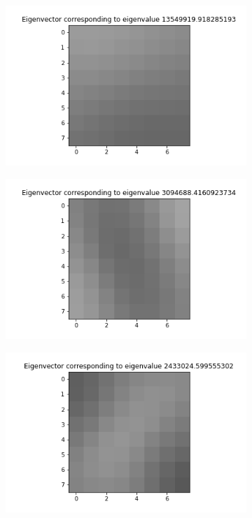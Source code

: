 \documentclass{article}
\begin{document}
\begin{figure}[h]
\begin{subfigure}{0.2\linewidth}
    \end{subfigure}
    \hfill
    \begin{subfigure}{0.2\linewidth}
        \centering
        \includegraphics[scale=0.2]{images/q4/donald/eigenvector2.png}
    \end{subfigure}
    \hfill
    \begin{subfigure}{0.2\linewidth}
        \centering
        \includegraphics[scale=0.2]{images/q4/donald/eigenvector3.png}
    \end{subfigure}
    \newline
    \begin{subfigure}{0.2\linewidth}
        \centering
        \includegraphics[scale=0.2]{images/q4/donald/eigenvector4.png}

\end{subfigure}
\end{figure}
\end{document}
